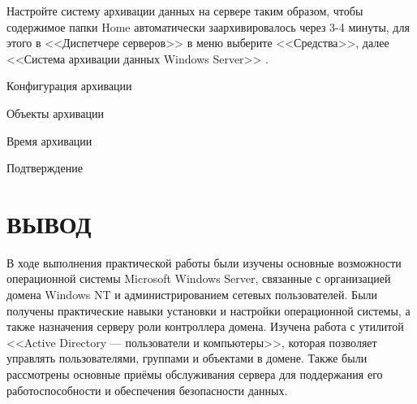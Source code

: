 Настройте систему архивации данных на сервере таким образом,
чтобы содержимое папки Home автоматически заархивировалось через 3-4 минуты,
для этого в <<Диспетчере серверов>> в меню выберите <<Средства>>,
далее <<Система архивации данных Windows Server>>
.

\begin{image}
	\caption{Конфигурация архивации}
	\label{fig:arch:config}
\end{image}

\begin{image}
	\caption{Объекты архивации}
	\label{fig:arch:object}
\end{image}

\begin{image}
	\caption{Время архивации}
	\label{fig:arch:time}
\end{image}

\begin{image}
	\caption{Подтверждение}
	\label{fig:arch:confirmation}
\end{image}

\clearpage

\section*{ВЫВОД}

В ходе выполнения практической работы были изучены основные возможности
операционной системы Microsoft Windows Server,
связанные с организацией домена Windows NT
и администрированием сетевых пользователей.
Были получены практические навыки установки и настройки операционной системы,
а также назначения серверу роли контроллера домена.
Изучена работа с утилитой <<Active Directory --- пользователи и компьютеры>>,
которая позволяет управлять пользователями, группами и объектами в домене.
Также были рассмотрены основные приёмы обслуживания сервера
для поддержания его работоспособности и обеспечения безопасности данных.

